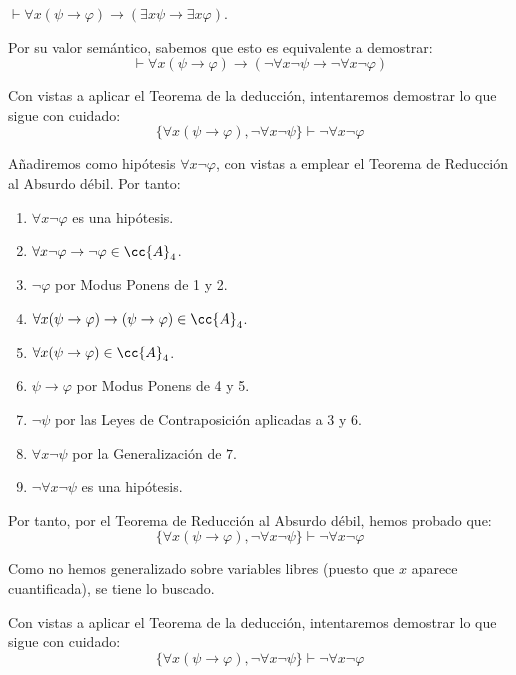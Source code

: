 \begin{ejercicio}\label{ej:2.8}
    $\vdash \forall x(\psi \rightarrow \varphi) \rightarrow (\exists x \psi \rightarrow \exists x \varphi)$.


    Por su valor semántico, sabemos que esto es equivalente a demostrar:
    \begin{equation*}
        \vdash \forall x(\psi \rightarrow \varphi) \rightarrow (\neg\forall x\neg \psi \rightarrow \neg\forall x\neg \varphi)
    \end{equation*}

    Con vistas a aplicar el Teorema de la deducción, intentaremos demostrar lo que sigue con cuidado:
    \begin{equation*}
        \{\forall x(\psi \rightarrow \varphi), \neg\forall x\neg \psi \}\vdash \neg\forall x\neg \varphi
    \end{equation*}

    Añadiremos como hipótesis $\forall x\neg \varphi$, con vistas a emplear el Teorema de Reducción al Absurdo débil. Por tanto:
    \begin{enumerate}
        \item $\forall x\neg \varphi$ es una hipótesis.
        \item $\forall x\neg\varphi \rightarrow \neg\varphi\in \cc{A}_4$.
        \item $\neg\varphi$ por Modus Ponens de 1 y 2.
        \item $\forall x(\psi \rightarrow \varphi)\rightarrow (\psi \rightarrow \varphi)\in \cc{A}_4$.
        \item $\forall x(\psi \rightarrow \varphi)\in \cc{A}_4$.
        \item $\psi \rightarrow \varphi$ por Modus Ponens de 4 y 5.
        \item $\neg \psi$ por las Leyes de Contraposición aplicadas a $3$ y $6$.
        \item $\forall x\neg \psi$ por la Generalización de $7$.
        \item $\neg\forall x\neg \psi$ es una hipótesis.
    \end{enumerate}

    Por tanto, por el Teorema de Reducción al Absurdo débil, hemos probado que:
    \begin{equation*}
        \{\forall x(\psi \rightarrow \varphi), \neg\forall x\neg \psi \}\vdash \neg\forall x\neg \varphi
    \end{equation*}

    Como no hemos generalizado sobre variables libres (puesto que $x$ aparece cuantificada), se tiene lo buscado.



    Con vistas a aplicar el Teorema de la deducción, intentaremos demostrar lo que sigue con cuidado:
    \begin{equation*}
        \{\forall x(\psi \rightarrow \varphi), \neg\forall x\neg \psi \}\vdash \neg\forall x\neg \varphi
    \end{equation*}

    
\end{ejercicio}

